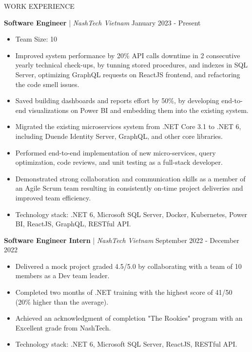 \begin{rSection}{WORK EXPERIENCE}

    \quad\textbf{Software Engineer} | \textit{NashTech Vietnam} \hfill January 2023 - Present\\
    \begin{itemize}
        \itemsep 0pt {} \vspace{-1em}
        \item Team Size: 10
        \item Improved system performance by 20\% API calls downtime in 2 consecutive yearly technical check-ups,
              by tunning stored procedures, and indexes in SQL Server, optimizing GraphQL requests on ReactJS frontend,
              and refactoring the code smell issues.
        \item Saved building dashboards and reports effort by 50\%, by developing end-to-end visualizations on Power BI
              and embedding them into the existing system.
        \item Migrated the existing microservices system from .NET Core 3.1 to .NET 6,
              including Duende Identity Server, GraphQL, and other core libraries.
        \item Performed end-to-end implementation of new micro-services, query optimization,
              code reviews, and unit testing as a full-stack developer.
        \item Demonstrated strong collaboration and communication skills as a member of an Agile Scrum team
              resulting in consistently on-time project deliveries and improved team efficiency.
        \item Technology stack: .NET 6, Microsoft SQL Server, Docker, Kubernetes, Power BI, ReactJS, GraphQL, RESTful API.
    \end{itemize}

    \vspace{1em}

    \quad\textbf{Software Engineer Intern} | \textit{NashTech Vietnam} \hfill September 2022 - December 2022\\
    \begin{itemize}
        \itemsep 0pt {} \vspace{-1em}
        \item Delivered a mock project graded 4.5/5.0 by collaborating with a team of 10 members as a Dev team leader.
        \item Completed two months of .NET training with the highest score of 41/50 (20\% higher than the average).
        \item Achieved an acknowledgment of completion "The Rookies" program with an Excellent grade from NashTech.
        \item Technology stack: .NET 6, Microsoft SQL Server, ReactJS, RESTful API.
    \end{itemize}


\end{rSection}
